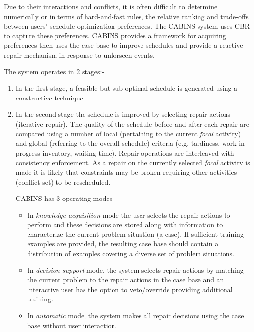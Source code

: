 Due to their interactions and conflicts, it is often difficult to determine numerically or in terms of hard-and-fast rules, the relative ranking and trade-offs between users' schedule optimization preferences. The CABINS system \citep{miyashita95cabins} uses CBR to capture these preferences. CABINS provides a framework for acquiring preferences then uses the case base to improve schedules and provide a reactive repair mechanism in response to unforseen events. 

The system operates in 2 stages:-
\begin{enumerate}
\item In the first stage, a feasible but sub-optimal schedule is generated using a constructive technique. 
\item In the second stage the schedule is improved by selecting repair actions (iterative repair). The quality of the schedule before and after each repair are compared using a number of local (pertaining to the current \emph{focal} activity) and global (referring to the overall schedule) criteria (e.g. tardiness, work-in-progress inventory, waiting time). Repair operations are interleaved with consistency enforcement. As a repair on the currently selected \emph{focal} activity is made it is likely that constraints may be broken requiring other activities (conflict set) to be rescheduled. 

CABINS has 3 operating modes:-
\begin{itemize}
\item In \emph{knowledge acquisition} mode the user selects the repair actions to perform and these decisions are stored along with information to characterize the current problem situation (a case). If sufficient training examples are provided, the resulting case base should contain a distribution of examples covering a diverse set of problem situations.

\item In \emph{decision support} mode, the system selects repair actions by matching the current problem to the repair actions in the case base and an interactive user has the option to veto/override providing additional training.

\item In \emph{automatic} mode, the system makes all repair decisions using the case base without user interaction.
\end{itemize}
\end{enumerate}

